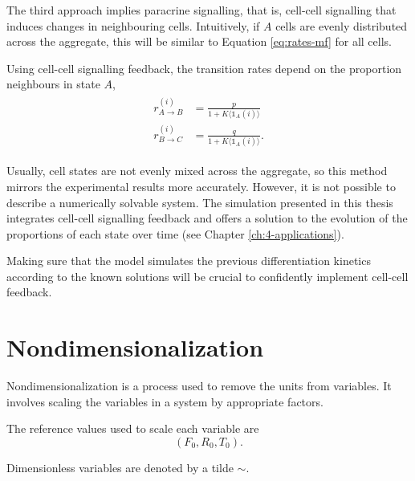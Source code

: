 The third approach implies paracrine signalling, that is, cell-cell signalling that induces changes in neighbouring cells.  Intuitively, if $A$ cells are evenly distributed across the aggregate, this will be similar to Equation \ref{eq:rates-mf} for all cells. 

\begin{definition}
    Using cell-cell signalling feedback, the transition rates depend on the proportion neighbours in state $A$,
    \begin{align}
        \begin{aligned}
            r_{A\rightarrow B}^{(i)}&=\frac{p}{1+K\langle\mathds{1}_A(i)\rangle}\\
            r_{B\rightarrow C}^{(i)}&=\frac{q}{1+K\langle\mathds{1}_A(i)\rangle}.
        \end{aligned}
    \end{align}
\end{definition}

Usually, cell states are not evenly mixed across the aggregate, so this method mirrors the experimental results more accurately. However, it is not possible to describe a numerically solvable system. The simulation presented in this thesis integrates cell-cell signalling feedback and offers a solution to the evolution of the proportions of each state over time (see Chapter \ref{ch:4-applications}). 

Making sure that the model simulates the previous differentiation kinetics according to the known solutions will be crucial to confidently implement cell-cell feedback.



\section{Nondimensionalization}\label{sec:nondimensionalization}

Nondimensionalization is a process used to remove the units from variables. It involves scaling the variables in a system by appropriate factors.

\begin{definition}
    The reference values used to scale each variable are
    $$(F_0,R_0,T_0).$$
\end{definition}

\begin{notation}
    Dimensionless variables are denoted by a tilde $\sim$.
\end{notation}

